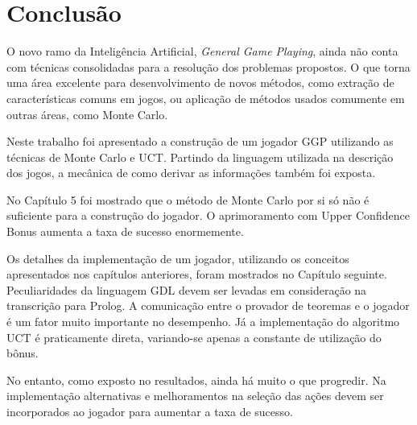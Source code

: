 \chapter{Conclusão}
O novo ramo da Inteligência Artificial, \textit{General Game Playing}, ainda não conta com técnicas consolidadas para a resolução dos problemas propostos. O que torna uma área excelente para desenvolvimento de novos métodos, como extração de características comuns em jogos, ou aplicação de métodos usados comumente em outras áreas, como Monte Carlo.

Neste trabalho foi apresentado a construção de um jogador GGP utilizando as técnicas de Monte Carlo e UCT. Partindo da linguagem utilizada na descrição dos jogos, a mecânica de como derivar as informações também foi exposta. 

No Capítulo 5 foi mostrado que o método de Monte Carlo por si só não é suficiente para a construção do jogador. O aprimoramento com Upper Confidence Bonus aumenta a taxa de sucesso enormemente. 

Os detalhes da implementação de um jogador, utilizando os conceitos apresentados nos capítulos anteriores, foram mostrados no Capítulo seguinte. Peculiaridades da linguagem GDL devem ser levadas em consideração na transcrição para Prolog. A comunicação entre o provador de teoremas e o jogador é um fator muito importante no desempenho. Já a implementação do algoritmo UCT é praticamente direta, variando-se apenas a constante de utilização do bônus.

No entanto, como exposto no resultados, ainda há muito o que progredir. Na implementação alternativas e melhoramentos na seleção das ações devem ser incorporados ao jogador para aumentar a taxa de sucesso.
